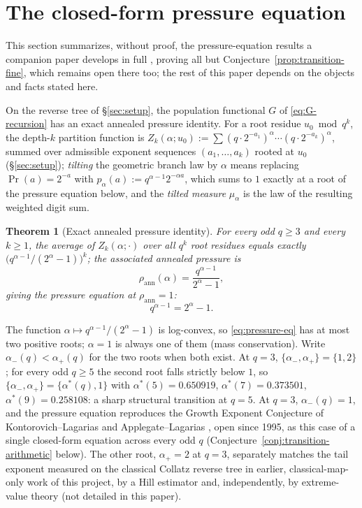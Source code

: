 \documentclass[11pt]{article}
\newtheorem{theorem}{Theorem}[section]
\theoremstyle{definition}
\theoremstyle{remark}
\begin{document}
\section{The closed-form pressure equation}
\label{sec:pressure}

This section summarizes, without proof, the pressure-equation results
a companion paper develops in full \cite{PressureCompanion}, proving
all but Conjecture~\ref{prop:transition-fine}, which remains open
there too; the rest of this paper depends on the objects and facts
stated here.

On the reverse tree of \S\ref{sec:setup}, the population functional $G$
of \eqref{eq:G-recursion} has an exact annealed pressure identity. For
a root residue $u_0\bmod q^k$, the depth-$k$ partition function is
$Z_k(\alpha;u_0):=\sum(q\cdot2^{-a_1})^\alpha\cdots(q\cdot2^{-a_k})^\alpha$,
summed over admissible exponent sequences $(a_1,\dots,a_k)$ rooted at
$u_0$ (\S\ref{sec:setup}); \emph{tilting} the geometric branch law by
$\alpha$ means replacing $\Pr(a)=2^{-a}$ with
$p_\alpha(a):=q^{\alpha-1}2^{-\alpha a}$, which sums to $1$ exactly at
a root of the pressure equation below, and the \emph{tilted measure}
$\mu_\alpha$ is the law of the resulting weighted digit sum.

\begin{theorem}[Exact annealed pressure identity]\label{thm:pressure}
For every odd $q\ge3$ and every $k\ge1$, the average of
$Z_k(\alpha;\cdot)$ over all $q^k$ root residues
equals exactly $\bigl(q^{\alpha-1}/(2^\alpha-1)\bigr)^k$; the associated
annealed pressure is
\begin{equation}\label{eq:pressure-closed-form}
  \rho_{\mathrm{ann}}(\alpha) = \frac{q^{\alpha-1}}{2^\alpha-1},
\end{equation}
giving the pressure equation at $\rho_{\mathrm{ann}}=1$:
\begin{equation}\label{eq:pressure-eq}
  q^{\alpha-1} = 2^{\alpha}-1.
\end{equation}
\end{theorem}

The function $\alpha\mapsto q^{\alpha-1}/(2^\alpha-1)$ is log-convex, so
\eqref{eq:pressure-eq} has at most two positive roots; $\alpha=1$ is
always one of them (mass conservation). Write $\alpha_-(q)<\alpha_+(q)$
for the two roots when both exist. At $q=3$, $\{\alpha_-,\alpha_+\}=
\{1,2\}$; for every odd $q\ge5$ the second root falls strictly below
$1$, so $\{\alpha_-,\alpha_+\}=\{\alpha^\ast(q),1\}$ with
$\alpha^\ast(5)=0.650919$, $\alpha^\ast(7)=0.373501$,
$\alpha^\ast(9)=0.258108$: a sharp structural transition at $q=5$.
At $q=3$, $\alpha_-(q)=1$, and the pressure
equation reproduces the Growth Exponent Conjecture of
Kontorovich--Lagarias \cite{KontorovichLagarias2009} and
Applegate--Lagarias
\cite{ApplegateLagarias1995I,ApplegateLagarias1995II}, open since
1995, as this case of a single closed-form equation across every odd
$q$ (Conjecture~\ref{conj:transition-arithmetic} below). The other
root, $\alpha_+=2$ at $q=3$, separately matches the tail exponent
measured on the classical Collatz reverse tree in earlier,
classical-map-only work of this project, by a Hill estimator and,
independently, by extreme-value theory (not detailed in this paper).
\end{document}

